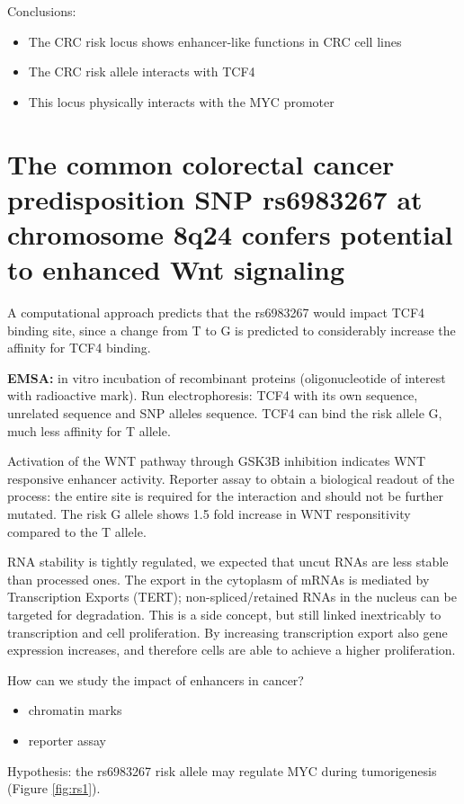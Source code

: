 Conclusions:
\begin{itemize}
\tightlist
\item
  The CRC risk locus shows enhancer-like functions in CRC cell lines
\item
  The CRC risk allele interacts with TCF4
\item
  This locus physically interacts with the MYC promoter
\end{itemize}

\section{The common colorectal cancer predisposition SNP rs6983267 at chromosome 8q24 confers potential to enhanced Wnt signaling}

A computational approach predicts that the rs6983267 would impact TCF4 binding site, since a change from T to G is predicted to considerably increase the affinity for TCF4 binding. 

\textbf{EMSA:} in vitro incubation of recombinant proteins (oligonucleotide of interest with radioactive mark). Run electrophoresis: TCF4 with its own sequence, unrelated sequence and SNP alleles sequence. TCF4 can bind the risk allele G, much less affinity for T allele.

Activation of the WNT pathway through GSK3B inhibition indicates WNT responsive enhancer activity. Reporter assay to obtain a biological readout of the process: the entire site is required for the interaction and should not be further mutated. The risk G allele shows 1.5 fold increase in WNT responsitivity compared to the T allele.

RNA stability is tightly regulated, we expected that uncut RNAs are less stable than processed ones. The export in the cytoplasm of mRNAs is mediated by Transcription Exports (TERT); non-spliced/retained RNAs in the nucleus can be targeted for degradation. This is a side concept, but still linked inextricably to transcription and cell proliferation. By increasing transcription export also gene expression increases, and therefore cells are able to achieve a higher proliferation.

How can we study the impact of enhancers in cancer?
\begin{itemize}
\tightlist
\item
  chromatin marks
\item
  reporter assay
\end{itemize}

Hypothesis: the rs6983267 risk allele may regulate MYC during tumorigenesis (Figure \ref{fig:rs1}).

